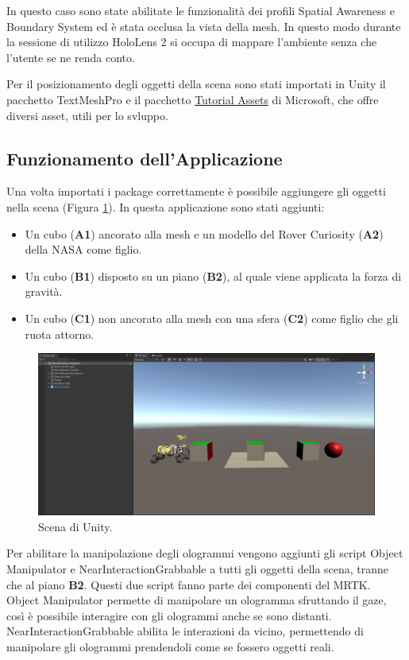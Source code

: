 In questo caso sono state abilitate le funzionalità dei profili Spatial Awareness e Boundary System ed è stata occlusa la vista della mesh. In questo modo durante la sessione di utilizzo HoloLens 2 si occupa di mappare l'ambiente senza che l'utente se ne renda conto.

Per il posizionamento degli oggetti della scena sono stati importati in Unity il pacchetto TextMeshPro e il pacchetto \href{https://github.com/microsoft/MixedRealityLearning/releases/tag/getting-started-v2.5.0}{Tutorial Assets} di Microsoft, che offre diversi asset, utili per lo svluppo.

\subsection{Funzionamento dell'Applicazione}
Una volta importati i package correttamente è possibile aggiungere gli oggetti nella scena (Figura \ref{fig:figure26}).
In questa applicazione sono stati aggiunti:
\begin{itemize}
    \item Un cubo (\textbf{A1}) ancorato alla mesh e un modello del Rover Curiosity (\textbf{A2}) della NASA come figlio.
    \item Un cubo (\textbf{B1}) disposto su un piano (\textbf{B2}), al quale viene applicata la forza di gravità.
    \item Un cubo (\textbf{C1}) non ancorato alla mesh con una sfera (\textbf{C2}) come figlio che gli ruota attorno.
\end{itemize}

\begin{figure}[t]
    \centering
    \includegraphics[width=\textwidth]{images/unity-scene.png}
    \caption{Scena di Unity.}
    \label{fig:figure26}
\end{figure}

Per abilitare la manipolazione degli ologrammi vengono aggiunti gli script Object Manipulator e NearInteractionGrabbable a tutti gli oggetti della scena, tranne che al piano \textbf{B2}. Questi due script fanno parte dei componenti del MRTK.
Object Manipulator permette di manipolare un ologramma sfruttando il gaze, così è possibile interagire con gli ologrammi anche se sono distanti. NearInteractionGrabbable abilita le interazioni da vicino, permettendo di manipolare gli ologrammi prendendoli come se fossero oggetti reali.

